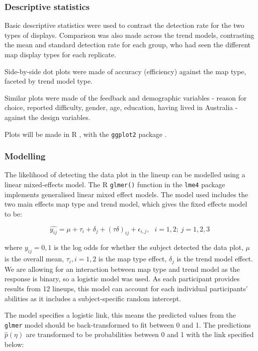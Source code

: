 \documentclass[times, doublespace]{anzsauth}
\begin{document}
\subsubsection{Descriptive statistics}\label{descriptive-statistics}

Basic descriptive statistics were used to contrast the detection rate
for the two types of displays. Comparison was also made across the trend
models, contrasting the mean and standard detection rate for each group,
who had seen the different map display types for each replicate.

Side-by-side dot plots were made of accuracy (efficiency) against the map
type, faceted by trend model type.

Similar plots were made of the feedback and demographic variables -
reason for choice, reported difficulty, gender, age, education, having
lived in Australia - against the design variables.

Plots will be made in R \citep{RCore}, with the
 \texttt{ggplot2} package \citep{ggplot2}.

\subsubsection{Modelling}\label{modelling}

The likelihood of detecting the data plot in the lineup can be modelled
using a linear mixed-effects model. The R \citep{RCore}
 \texttt{glmer()} function in the  \texttt{lme4}
\citep{lme4} package implements generalised linear
mixed effect models. The model used includes the two main effects map
type and trend model, which gives the fixed effects model to be:

\[\widehat{y_{ij}} = \mu + \tau_i + \delta_j + (\tau\delta)_{ij} + \epsilon_{i,j}, ~~~ i=1,2; ~j=1,2,3\]

where \(y_{ij} = 0, 1\) is the log odds for whether the subject
detected the data plot, \(\mu\) is the overall mean, \(\tau_i, i=1,2\)
is the map type effect, \(\delta_j\) is the trend model effect. We are
allowing for an interaction between map type and trend model as the
response is binary, so a logistic model was used. As each participant
provides results from 12 lineups, this model can account for each
individual participants' abilities as it includes a subject-specific
random intercept.

The model specifies a logistic link, this means the predicted values
from the \texttt{glmer} model should be back-transformed to fit between
0 and 1. The predictions \(\widehat{p}(\eta)\) are transformed to be
probabilities between 0 and 1 with the link specified below:
\end{document}
